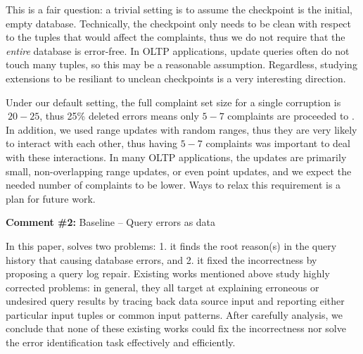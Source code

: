 \begin{quote}
\end{quote}
This is a fair question: a trivial setting is to assume the checkpoint is the initial, empty database.
Technically, the checkpoint only needs to be clean with respect to the tuples that would affect the complaints, thus we do not require that the {\it entire} database is error-free.  In OLTP applications, update queries often do not touch many tuples, so this may be a reasonable assumption.  
Regardless, studying extensions to be resiliant to unclean checkpoints is a very interesting direction.

\begin{quote}
\end{quote}

Under our default setting, the full complaint set size for a single corruption is $~20-25$, thus 
25\% deleted errors means only $5-7$ complaints are proceeded to \sys. 
In addition, we used range updates with random ranges, thus they are very likely to interact with each other, thus having $5-7$ complaints was important to deal with these interactions.  In many OLTP applications, the updates are primarily small, non-overlapping range updates, or even point updates, and we expect the needed number of complaints to be lower.  Ways to relax this requirement is a plan for future work.



\comskip

\noindent
\textbf{Comment \#2:} Baseline -- Query errors as data
\begin{quote}
\end{quote}


In this paper, \sys solves two problems: 1. it finds the root reason(s) in the
query history that causing database errors, and 2. it fixed the incorrectness
by proposing a query log repair. Existing works mentioned above study highly
corrected problems: in general, they all target at explaining erroneous or
undesired query results by tracing back data source input and reporting either
particular input tuples or common input patterns. After carefully analysis, we
conclude that none of these existing works could fix the incorrectness nor
solve the error identification task effectively and efficiently.

